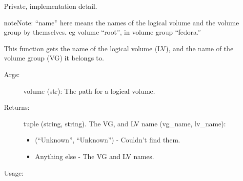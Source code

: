\documentclass[letterpaper,10pt,english]{sphinxmanual}
\begin{document}
\begin{fulllineitems}
\label{\detokenize{linux:getdevinfo.linux.get_lv_and_vg_name}}
Private, implementation detail.

\begin{sphinxadmonition}{note}{Note:}
“name” here means the names of the logical volume and
the volume group by themselves. eg volume “root”, in
volume group “fedora.”
\end{sphinxadmonition}

This function gets the name of the logical volume (LV), and the
name of the volume group (VG) it belongs to.
\begin{description}
\item[{Args:}] \leavevmode
volume (str):   The path for a logical volume.

\item[{Returns:}] \leavevmode
tuple (string, string). The VG, and LV name (vg\_name, lv\_name):
\begin{itemize}
\item {} 
(“Unknown”, “Unknown”) - Couldn’t find them.

\item {} 
Anything else          - The VG and LV names.

\end{itemize}

\end{description}

Usage:

\begin{sphinxVerbatim}[commandchars=\\\{\}]
   
\end{sphinxVerbatim}

\end{fulllineitems}

\end{document}
